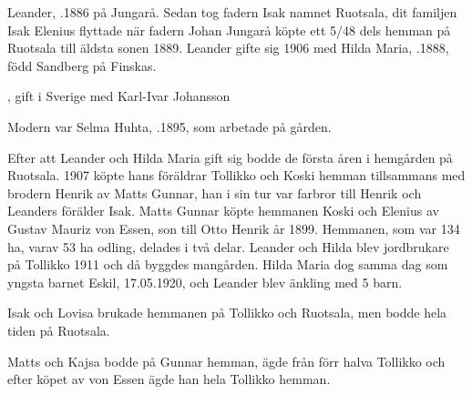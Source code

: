Leander, .1886 på Jungarå. Sedan tog fadern Isak namnet Ruotsala, dit familjen Isak Elenius flyttade när fadern Johan Jungarå köpte ett 5/48 dels hemman på Ruotsala till äldsta sonen 1889. Leander gifte sig 1906 med Hilda Maria, .1888, född Sandberg på Finskas.
\begin{jhchildren}
  \item {}
  \item {}
  \item {}
  \item {}
  \item {}
  \item {}, gift i Sverige med Karl-Ivar Johansson
  \item {}
  \item {} Modern var Selma Huhta, .1895, som arbetade på gården.
\end{jhchildren}
Efter att Leander och Hilda Maria gift sig bodde de första åren i hemgården på Ruotsala. 1907 köpte hans föräldrar Tollikko och Koski hemman tillsammans med brodern Henrik av Matts Gunnar, han i sin tur var farbror till Henrik och Leanders förälder Isak. Matts Gunnar köpte hemmanen Koski och Elenius av Gustav Mauriz von Essen, son till Otto Henrik år 1899. Hemmanen, som var 134 ha, varav 53 ha odling, delades i två delar. Leander och Hilda blev jordbrukare på Tollikko 	1911 och då byggdes mangården. Hilda Maria dog samma dag som yngsta barnet Eskil, 17.05.1920, och Leander blev änkling med 5 barn.


Isak och Lovisa brukade hemmanen på Tollikko och Ruotsala, men bodde hela tiden på Ruotsala.


Matts och Kajsa bodde på Gunnar hemman, ägde från förr halva Tollikko och efter köpet av von Essen ägde han hela Tollikko hemman.


